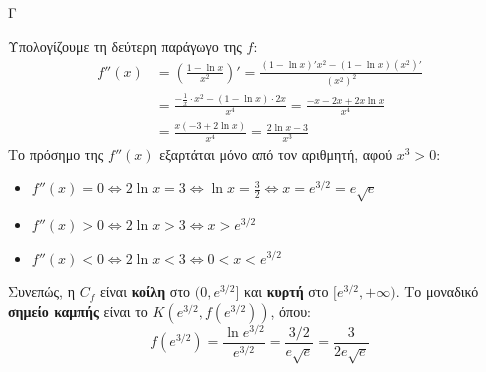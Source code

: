 \begin{thema}{Γ}
\begin{erwthma}
\item Υπολογίζουμε τη δεύτερη παράγωγο της $f$:
\begin{align*}
f''(x) &= \left( \frac{1 - \ln x}{x^2} \right)' = \frac{(1 - \ln x)' x^2 - (1 - \ln x)(x^2)'}{(x^2)^2} \\
&= \frac{-\frac{1}{x} \cdot x^2 - (1 - \ln x) \cdot 2x}{x^4} = \frac{-x - 2x + 2x \ln x}{x^4} \\
&= \frac{x(-3 + 2 \ln x)}{x^4} = \frac{2\ln x - 3}{x^3}
\end{align*}
Το πρόσημο της $f''(x)$ εξαρτάται μόνο από τον αριθμητή, αφού $x^3 > 0$:
\begin{itemize}
    \item $f''(x) = 0 \Leftrightarrow 2\ln x = 3 \Leftrightarrow \ln x = \frac{3}{2} \Leftrightarrow x = e^{3/2} = e\sqrt{e}$
    \item $f''(x) > 0 \Leftrightarrow 2\ln x > 3 \Leftrightarrow x > e^{3/2}$
    \item $f''(x) < 0 \Leftrightarrow 2\ln x < 3 \Leftrightarrow 0 < x < e^{3/2}$
\end{itemize}
\begin{center}
\end{center}
Συνεπώς, η $C_f$ είναι \textbf{κοίλη} στο $(0, e^{3/2}]$ και \textbf{κυρτή} στο $[e^{3/2}, +\infty)$.
Το μοναδικό \textbf{σημείο καμπής} είναι το $K(e^{3/2}, f(e^{3/2}))$, όπου:
\[ f(e^{3/2}) = \frac{\ln e^{3/2}}{e^{3/2}} = \frac{3/2}{e\sqrt{e}} = \frac{3}{2e\sqrt{e}} \]


\end{erwthma}
\end{thema}
